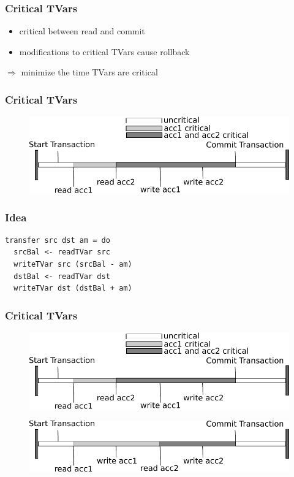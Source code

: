 \documentclass{beamer}
\begin{document}
\begin{frame}
 \frametitle{Critical TVars}
   \begin{itemize}\setlength\itemsep{1em}
    \item critical between read and commit
    \item modifications to critical TVars cause rollback
   \end{itemize}
   \pause
   \vfill
   $\Rightarrow$ minimize the time TVars are critical 
\end{frame}


  
  \begin{frame}
   \frametitle{Critical TVars}
   \begin{figure}
    \includegraphics[scale=0.7]{ressources/CriticalValue.pdf}
   \end{figure}
   \end{frame}

\begin{frame}[fragile]
\frametitle{Idea}
\begin{lstlisting}
transfer src dst am = do 
  srcBal <- readTVar src
  writeTVar src (srcBal - am)
  dstBal <- readTVar dst
  writeTVar dst (dstBal + am)
\end{lstlisting}
\end{frame}
  
     
  \begin{frame}
   \frametitle{Critical TVars}
   \begin{figure}
    \includegraphics[scale=0.7]{ressources/CriticalValue.pdf}
   \end{figure}
   \begin{figure}
    \includegraphics[scale=0.7]{ressources/CriticalValue2.pdf}
   \end{figure}
   \end{frame}
\end{document}
